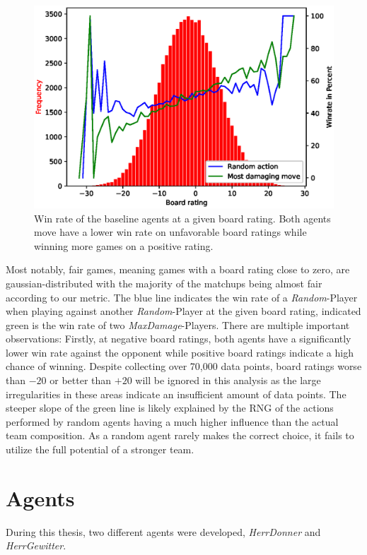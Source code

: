 \begin{figure}[h]
	\centering
	\includegraphics[width=\textwidth]{images/boardrating.eps}
	\caption{Win rate of the baseline agents at a given board rating. Both agents
  move have a lower win rate on unfavorable board ratings while winning more games on a positive rating.}
	\label{fig:wr-board-rating}
\end{figure}
Most notably, fair games, meaning games with a board rating close to zero, are gaussian-distributed with the majority
of the matchups being almost fair according to our metric. The blue line indicates the win rate of a \textit{Random}-Player
when playing against another \textit{Random}-Player at the given board rating, indicated green is the win rate of two
\textit{MaxDamage}-Players. There are multiple important observations: Firstly, at negative board ratings, both
agents have a significantly lower win rate against the opponent while positive board ratings indicate a high chance of 
winning. Despite collecting over 70,000 data points, board ratings worse than $-20$ or better than $+20$ will be ignored in this analysis
as the large irregularities in these areas indicate an insufficient amount of data points. 
The steeper slope of the green line is likely explained by the \ac{RNG} of the actions performed by random agents having 
a much higher influence than the actual team composition. As a random agent rarely makes the correct choice, it 
fails to utilize the full potential of a stronger team. 

\section{Agents}
During this thesis, two different agents were developed, \textit{HerrDonner} and \textit{HerrGewitter}.

